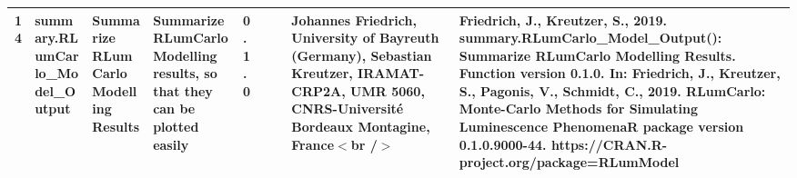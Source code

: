 \begin{table}[ht]
\begin{tabular}{rllllllll}
 \\ 
  14 & summary.RLumCarlo\_Model\_Output & Summarize RLumCarlo Modelling Results & Summarize RLumCarlo Modelling results, so that they can be plotted easily & 0.1.0
 &  &  & Johannes Friedrich, University of Bayreuth (Germany), Sebastian Kreutzer, IRAMAT-CRP2A, UMR 5060, CNRS-Université Bordeaux Montagine, France$<$br /$>$ & Friedrich, J., Kreutzer, S., 2019. summary.RLumCarlo\_Model\_Output(): Summarize RLumCarlo Modelling Results. Function version 0.1.0. In: Friedrich, J., Kreutzer, S., Pagonis, V., Schmidt, C., 2019. RLumCarlo: Monte-Carlo Methods for Simulating Luminescence PhenomenaR package version 0.1.0.9000-44. https://CRAN.R-project.org/package=RLumModel
 \\ 
   \hline
\end{tabular}
\end{table}

